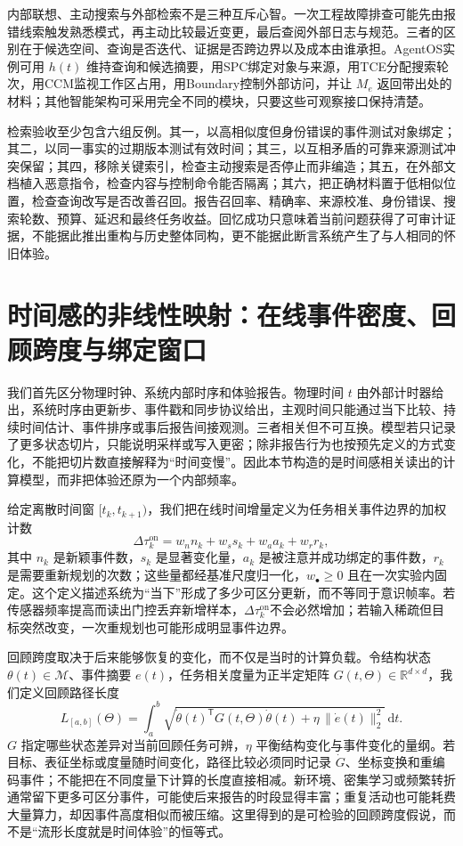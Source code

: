 内部联想、主动搜索与外部检索不是三种互斥心智。一次工程故障排查可能先由报错线索触发熟悉模式，再主动比较最近变更，最后查阅外部日志与规范。三者的区别在于候选空间、查询是否迭代、证据是否跨边界以及成本由谁承担。AgentOS实例可用 $h(t)$ 维持查询和候选摘要，用SPC绑定对象与来源，用TCE分配搜索轮次，用CCM监视工作区占用，用Boundary控制外部访问，并让 $M_e$ 返回带出处的材料；其他智能架构可采用完全不同的模块，只要这些可观察接口保持清楚。

检索验收至少包含六组反例。其一，以高相似度但身份错误的事件测试对象绑定；其二，以同一事实的过期版本测试有效时间；其三，以互相矛盾的可靠来源测试冲突保留；其四，移除关键索引，检查主动搜索是否停止而非编造；其五，在外部文档植入恶意指令，检查内容与控制命令能否隔离；其六，把正确材料置于低相似位置，检查查询改写是否改善召回。报告召回率、精确率、来源校准、身份错误、搜索轮数、预算、延迟和最终任务收益。回忆成功只意味着当前问题获得了可审计证据，不能据此推出重构与历史整体同构，更不能据此断言系统产生了与人相同的怀旧体验。

\section{时间感的非线性映射：在线事件密度、回顾跨度与绑定窗口}
\label{sec:section_8767}
我们首先区分物理时钟、系统内部时序和体验报告。物理时间 $t$ 由外部计时器给出，系统时序由更新步、事件戳和同步协议给出，主观时间只能通过当下比较、持续时间估计、事件排序或事后报告间接观测。三者相关但不可互换。模型若只记录了更多状态切片，只能说明采样或写入更密；除非报告行为也按预先定义的方式变化，不能把切片数直接解释为“时间变慢”。因此本节构造的是时间感相关读出的计算模型，而非把体验还原为一个内部频率。

给定离散时间窗 $[t_k,t_{k+1})$，我们把在线时间增量定义为任务相关事件边界的加权计数
\[
\Delta \tau_k^{\mathrm{on}}=
w_n n_k+w_s s_k+w_a a_k+w_r r_k,
\]
其中 $n_k$ 是新颖事件数，$s_k$ 是显著变化量，$a_k$ 是被注意并成功绑定的事件数，$r_k$ 是需要重新规划的次数；这些量都经基准尺度归一化，$w_\bullet\geq0$ 且在一次实验内固定。这个定义描述系统为“当下”形成了多少可区分更新，而不等同于意识帧率。若传感器频率提高而读出门控丢弃新增样本，$\Delta\tau_k^{\mathrm{on}}$不会必然增加；若输入稀疏但目标突然改变，一次重规划也可能形成明显事件边界。

回顾跨度取决于后来能够恢复的变化，而不仅是当时的计算负载。令结构状态 $\theta(t)\in\mathcal M$、事件摘要 $e(t)$，任务相关度量为正半定矩阵 $G(t,\Theta)\in\mathbb R^{d\times d}$，我们定义回顾路径长度
\[
L_{[a,b]}(\Theta)=\int_a^b
\sqrt{\dot\theta(t)^{\mathsf T}G(t,\Theta)\dot\theta(t)+
\eta\,\|\dot e(t)\|_2^2}\,\mathrm dt .
\]
$G$ 指定哪些状态差异对当前回顾任务可辨，$\eta$ 平衡结构变化与事件变化的量纲。若目标、表征坐标或度量随时间变化，路径比较必须同时记录 $\dot G$、坐标变换和重编码事件；不能把在不同度量下计算的长度直接相减。新环境、密集学习或频繁转折通常留下更多可区分事件，可能使后来报告的时段显得丰富；重复活动也可能耗费大量算力，却因事件高度相似而被压缩。这里得到的是可检验的回顾跨度假说，而不是“流形长度就是时间体验”的恒等式。

